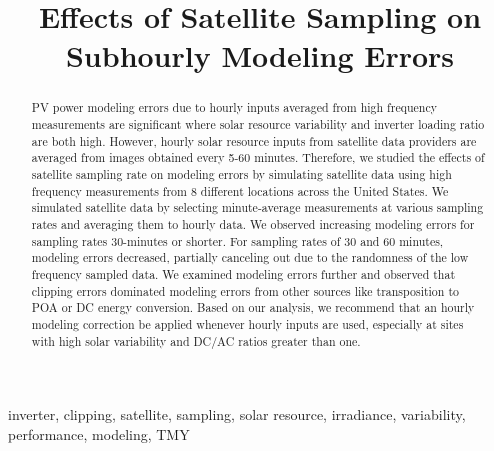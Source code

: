 \documentclass[conference]{IEEEtran}
\begin{document}
\title{Effects of Satellite Sampling on Subhourly Modeling Errors}

\author{
}

\maketitle

\begin{abstract}
PV power modeling errors due to hourly inputs averaged from high frequency measurements are significant where solar resource variability and inverter loading ratio are both high. However, hourly solar resource inputs from satellite data providers are averaged from images obtained every 5-60 minutes. Therefore, we studied the effects of satellite sampling rate on modeling errors by simulating satellite data using high frequency measurements from 8 different locations across the United States. We simulated satellite data by selecting minute-average measurements at various sampling rates and averaging them to hourly data. We observed increasing modeling errors for sampling rates 30-minutes or shorter. For sampling rates of 30 and 60 minutes, modeling errors decreased, partially canceling out due to the randomness of the low frequency sampled data. We examined modeling errors further and observed that clipping errors dominated modeling errors from other sources like transposition to POA or DC energy conversion. Based on our analysis, we recommend that an hourly modeling correction be applied whenever hourly inputs are used, especially at sites with high solar variability and DC/AC ratios greater than one.
\end{abstract}

\begin{IEEEkeywords}
inverter, clipping, satellite, sampling, solar resource, irradiance, variability, performance, modeling, TMY
\end{IEEEkeywords}
\end{document}
